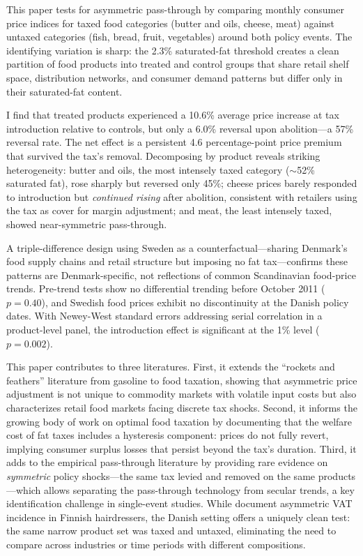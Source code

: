 \documentclass[12pt]{article}
\begin{document}
This paper tests for asymmetric pass-through by comparing monthly consumer price indices for taxed food categories (butter and oils, cheese, meat) against untaxed categories (fish, bread, fruit, vegetables) around both policy events. The identifying variation is sharp: the 2.3\% saturated-fat threshold creates a clean partition of food products into treated and control groups that share retail shelf space, distribution networks, and consumer demand patterns but differ only in their saturated-fat content.

I find that treated products experienced a 10.6\% average price increase at tax introduction relative to controls, but only a 6.0\% reversal upon abolition---a 57\% reversal rate. The net effect is a persistent 4.6 percentage-point price premium that survived the tax's removal. Decomposing by product reveals striking heterogeneity: butter and oils, the most intensely taxed category ($\sim$52\% saturated fat), rose sharply but reversed only 45\%; cheese prices barely responded to introduction but \textit{continued rising} after abolition, consistent with retailers using the tax as cover for margin adjustment; and meat, the least intensely taxed, showed near-symmetric pass-through.

A triple-difference design using Sweden as a counterfactual---sharing Denmark's food supply chains and retail structure but imposing no fat tax---confirms these patterns are Denmark-specific, not reflections of common Scandinavian food-price trends. Pre-trend tests show no differential trending before October 2011 ($p = 0.40$), and Swedish food prices exhibit no discontinuity at the Danish policy dates. With Newey-West standard errors addressing serial correlation in a product-level panel, the introduction effect is significant at the 1\% level ($p = 0.002$).

This paper contributes to three literatures. First, it extends the ``rockets and feathers'' literature \citep{borenstein1997, peltzman2000, tappata2009} from gasoline to food taxation, showing that asymmetric price adjustment is not unique to commodity markets with volatile input costs but also characterizes retail food markets facing discrete tax shocks. Second, it informs the growing body of work on optimal food taxation \citep{allcott2019regressive, griffith2018, odonnell2021} by documenting that the welfare cost of fat taxes includes a hysteresis component: prices do not fully revert, implying consumer surplus losses that persist beyond the tax's duration. Third, it adds to the empirical pass-through literature \citep{weyl2013, ganapati2020, benzarti2020} by providing rare evidence on \textit{symmetric} policy shocks---the same tax levied and removed on the same products---which allows separating the pass-through technology from secular trends, a key identification challenge in single-event studies. While \citet{benzarti2020} document asymmetric VAT incidence in Finnish hairdressers, the Danish setting offers a uniquely clean test: the same narrow product set was taxed and untaxed, eliminating the need to compare across industries or time periods with different compositions.
\end{document}
